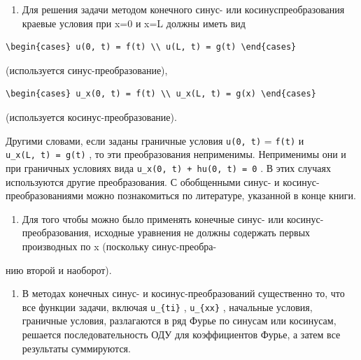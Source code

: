 \documentclass[
  ukrainian,
]{article}
\providecommand{\tightlist}{%
  \setlength{\itemsep}{0pt}\setlength{\parskip}{0pt}}
\begin{document}
\begin{enumerate}
\def\labelenumi{\arabic{enumi}.}
\tightlist
\item
  Для решения задачи методом конечного синус- или косинуспреобразования
  краевые условия при x=0 и x=L должны иметь вид
\end{enumerate}

\begin{verbatim}
\begin{cases} u(0, t) = f(t) \\ u(L, t) = g(t) \end{cases}
\end{verbatim}

(используется синус-преобразование),

\begin{verbatim}
\begin{cases} u_x(0, t) = f(t) \\ u_x(L, t) = g(x) \end{cases}
\end{verbatim}

(используется косинус-преобразование).

Другими словами, если заданы граничные условия \texttt{u(0,\ t)} =
\texttt{f(t)} и \texttt{u\_x(L,\ t)\ =\ g(t)} , то эти преобразования
неприменимы. Неприменимы они и при граничных условиях вида
\texttt{u\_x(0,\ t)\ +\ hu(0,\ t)\ =\ 0} . В этих случаях используются
другие преобразования. С обобщенными синус- и косинус-преобразованиями
можно познакомиться по литературе, указанной в конце книги.

\begin{enumerate}
\def\labelenumi{\arabic{enumi}.}
\setcounter{enumi}{1}
\tightlist
\item
  Для того чтобы можно было применять конечные синус- или
  косинус-преобразования, исходные уравнения не должны содержать первых
  производных по x (поскольку синус-преобра-
\end{enumerate}

нию второй и наоборот).

\begin{enumerate}
\def\labelenumi{\arabic{enumi}.}
\setcounter{enumi}{2}
\tightlist
\item
  В методах конечных синус- и косинус-преобразований существенно то, что
  все функции задачи, включая \texttt{u\_\{ti\}} , \texttt{u\_\{xx\}} ,
  начальные условия, граничные условия, разлагаются в ряд Фурье по
  синусам или косинусам, решается последовательность ОДУ для
  коэффициентов Фурье, а затем все результаты суммируются.
\end{enumerate}
\end{document}
